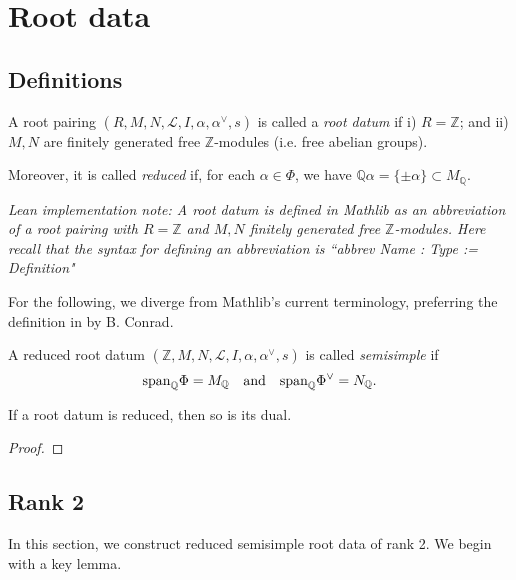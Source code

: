 \chapter{Root data}
\label{cha:construction-root-systems}
\section{Definitions}
\begin{definition}
    \label{def:root-datum}
    \leanok
     A root pairing $(R,M,N,\mathcal{L},I,\alpha, \alpha^\vee,s)$ is called a {\it root datum} if 
    i) $R = \mathbb{Z}$; and ii) $M,N$ are finitely generated free $\mathbb{Z}$-modules (i.e. free abelian groups).
    
    Moreover, it is called {\it reduced} if, for each $\alpha \in \Phi$, we have 
    $\mathbb{Q}\alpha = \{\pm \alpha\} \subset M_{\mathbb{Q}}$.
\end{definition}

{\it Lean implementation note: A root datum is defined in Mathlib as an abbreviation of 
a root pairing with $R = \mathbb{Z}$ and $M,N$ finitely generated free $\mathbb{Z}$-modules. Here 
recall that the syntax for defining an abbreviation is ``abbrev Name : Type := Definition"}

For the following, we diverge from Mathlib's current terminology, preferring the definition in 
by B. Conrad. 
\begin{definition}
    \label{def:rp-semisimple}
    \leanok
    A reduced root datum $(\mathbb{Z},M,N,\mathcal{L},I,\alpha, \alpha^\vee,s)$ is called {\it semisimple} if
    \[
        {\rm span}_{\mathbb{Q}} \Phi = M_{\mathbb{Q}} \quad \text{and} \quad {\rm span}_{\mathbb{Q}} \Phi^\vee = N_{\mathbb{Q}}.
    \] 
\end{definition}

\begin{lemma}
    If a root datum is reduced, then so is its dual. 
\end{lemma}
\begin{proof}
    
\end{proof}

\section{Rank 2}
In this section, we construct reduced semisimple root data of rank 2. We begin with a 
key lemma. 

